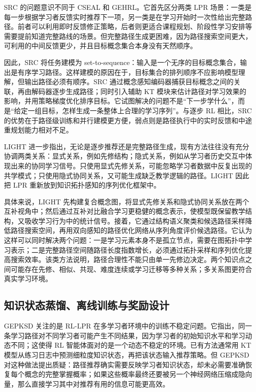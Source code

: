 \documentclass[UTF8,a4paper,zihao=-4]{ctexart}
\begin{document}
SRC 的问题意识不同于 CSEAL 和 GEHRL。它首先区分两类 LPR 场景：一类是每一步根据学习者反馈实时推荐下一项，另一类是在学习开始时一次性给出完整路径。前者可以利用即时反馈修正策略，后者则更适合课程规划、阶段性学习安排等需要提前知道完整路线的场景。但完整路径生成更困难，因为路径搜索空间更大，可利用的中间反馈更少，并且目标概念集合本身没有天然顺序\cite{Chen2023SRC}。

因此，SRC 将任务建模为 set-to-sequence：输入是一个无序的目标概念集合，输出是有序学习路径。这样建模的原因在于，目标集合的排列顺序不应影响模型理解，但输出路径必须有顺序。SRC 通过概念感知编码器捕获目标概念之间的关联，再由解码器逐步生成路径；同时引入辅助 KT 模块来估计路径对学习效果的影响，并用策略梯度优化排序目标。它试图解决的问题不是“下一步学什么”，而是“给定一组目标，怎样生成一条整体上合理的学习序列”。与逐步 RL 相比，SRC 的优势在于路径级训练和并行建模更方便，弱点则是路径执行中的实时反馈和中途重规划能力相对不足。

LIGHT 进一步指出，无论是逐步推荐还是完整路径生成，现有方法往往没有充分协调两类关系：显式关系，例如先修结构；隐式关系，例如从学习者历史交互中体现出来的协同学习信号。只使用显式先修关系，可能忽略学习者数据中反复出现的共学模式；只使用隐式协同关系，又可能生成缺乏教学逻辑的路径。LIGHT 因此把 LPR 重新放到知识拓扑感知的序列优化框架中\cite{Yu2025LIGHT}。

具体来说，LIGHT 先构建复合概念图，将显式先修关系和隐式协同关系放在两个互补视角中；然后通过互补对比融合学习更稳健的概念表示，使模型既保留教学结构，又吸收学习行为中的统计信号。接着，它通过结构语义聚类和候选路径采样降低路径搜索空间，再用双向感知的路径优化网络从序列角度评价候选路径。它认为这样可以同时解决两个问题：一是学习元素本身不是孤立节点，需要在图拓扑中学习表示；二是完整路径空间随路径长度指数增长，必须通过拓扑采样和序列优化提高搜索效率。该类方法说明，路径合理性不能只由单一先修边决定。两个知识点之间可能存在先修、相似、共现、难度连续或学习迁移等多种关系；多关系图更符合真实学习环境。

\subsection{知识状态蒸馏、离线训练与奖励设计}

GEPKSD 关注的是 RL-LPR 在多学习者环境中的训练不稳定问题。它指出，同一条学习路径对不同学习者可能产生不同结果，因为学习者的初始知识水平和学习动态不同；这使得 RL 智能体面对的是一个动态不稳定的环境。已有方法通常用 KT 模型从练习日志中预测细粒度知识状态，再把该状态输入推荐策略。但 GEPKSD 对这种做法提出质疑：路径推荐确实需要反映学习者知识状态，却未必需要准确恢复每个概念的完整掌握概率；如果这些概率最终还要被另一个神经网络压缩成隐向量，那么直接学习其中对推荐有用的信息可能更高效\cite{Li2024GEPKSD}。
\end{document}
